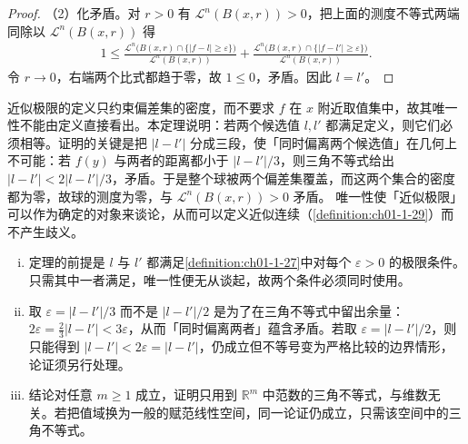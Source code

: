 \documentclass[../../main.tex]{subfiles}%
\begin{document}
\begin{proof}
（2）化矛盾。对 $r>0$ 有 $\mathcal{L}^{n}(B(x,r))>0$，把上面的测度不等式两端同除以 $\mathcal{L}^{n}(B(x,r))$ 得
\begin{align*}
1\leqslant\frac{\mathcal{L}^{n}\bigl(B(x,r)\cap\{\lvert f-l\rvert\geqslant\varepsilon\}\bigr)}{\mathcal{L}^{n}(B(x,r))}
+\frac{\mathcal{L}^{n}\bigl(B(x,r)\cap\{\lvert f-l'\rvert\geqslant\varepsilon\}\bigr)}{\mathcal{L}^{n}(B(x,r))} .
\end{align*}
令 $r\to0$，右端两个比式都趋于零，故 $1\leqslant0$，矛盾。因此 $l=l'$。
\end{proof}

\begin{remark}\label{remark:ch01-thm-1-36-动机}
近似极限的定义只约束偏差集的密度，而不要求 $f$ 在 $x$ 附近取值集中，故其唯一性不能由定义直接看出。本定理说明：若两个候选值 $l,l'$ 都满足定义，则它们必须相等。证明的关键是把 $\lvert l-l'\rvert$ 分成三段，使「同时偏离两个候选值」在几何上不可能：若 $f(y)$ 与两者的距离都小于 $\lvert l-l'\rvert/3$，则三角不等式给出 $\lvert l-l'\rvert<2\lvert l-l'\rvert/3$，矛盾。于是整个球被两个偏差集覆盖，而这两个集合的密度都为零，故球的测度为零，与 $\mathcal{L}^{n}(B(x,r))>0$ 矛盾。
唯一性使「近似极限」可以作为确定的对象来谈论，从而可以定义近似连续（\cref{definition:ch01-1-29}）而不产生歧义。%
\end{remark}

\begin{remark}\label{remark:ch01-thm-1-36-条件}
\begin{enumerate}[(i)]
\item 定理的前提是 $l$ 与 $l'$ 都满足\cref{definition:ch01-1-27}中对每个 $\varepsilon>0$ 的极限条件。只需其中一者满足，唯一性便无从谈起，故两个条件必须同时使用。%
\item 取 $\varepsilon=\lvert l-l'\rvert/3$ 而不是 $\lvert l-l'\rvert/2$ 是为了在三角不等式中留出余量：$2\varepsilon=\frac{2}{3}\lvert l-l'\rvert<3\varepsilon$，从而「同时偏离两者」蕴含矛盾。若取 $\varepsilon=\lvert l-l'\rvert/2$，则只能得到 $\lvert l-l'\rvert<2\varepsilon=\lvert l-l'\rvert$，仍成立但不等号变为严格比较的边界情形，论证须另行处理。
\item 结论对任意 $m\geqslant1$ 成立，证明只用到 $\mathbb{R}^m$ 中范数的三角不等式，与维数无关。若把值域换为一般的赋范线性空间，同一论证仍成立，只需该空间中的三角不等式。
\end{enumerate}
\end{remark}
\end{document}
